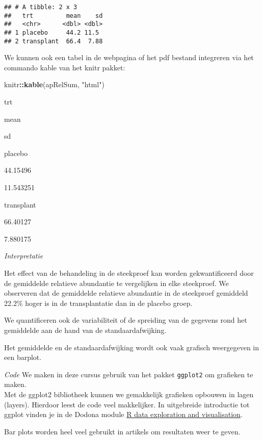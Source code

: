 \documentclass[
  12pt,dutch,coursenotes]{book}
\newenvironment{Shaded}{\begin{snugshade}}{\end{snugshade}}
\newcommand{\KeywordTok}[1]{\textcolor[rgb]{0.13,0.29,0.53}{\textbf{#1}}}
\newcommand{\NormalTok}[1]{#1}
\newcommand{\OperatorTok}[1]{\textcolor[rgb]{0.81,0.36,0.00}{\textbf{#1}}}
\newcommand{\StringTok}[1]{\textcolor[rgb]{0.31,0.60,0.02}{#1}}
\theoremstyle{definition}
\theoremstyle{definition}
\theoremstyle{definition}
\theoremstyle{remark}
\begin{document}
\begin{verbatim}
## # A tibble: 2 x 3
##   trt         mean    sd
##   <chr>      <dbl> <dbl>
## 1 placebo     44.2 11.5 
## 2 transplant  66.4  7.88
\end{verbatim}

We kunnen ook een tabel in de webpagina of het pdf bestand integreren via het commando kable van het knitr pakket:

\begin{Shaded}
\begin{Highlighting}[]
\NormalTok{knitr}\OperatorTok{::}\KeywordTok{kable}\NormalTok{(apRelSum, }\StringTok{"html"}\NormalTok{)}
\end{Highlighting}
\end{Shaded}

trt

mean

sd

placebo

44.15496

11.543251

transplant

66.40127

7.880175

\emph{Interpretatie}

Het effect van de behandeling in de steekproef kan worden gekwantificeerd door de gemiddelde relatieve abundantie te vergelijken in elke steekproef. We observeren dat de gemiddelde relatieve abundantie in de steekproef gemiddeld 22.2\% hoger is in de transplantatie dan in de placebo groep.

We quantificeren ook de variabiliteit of de spreiding van de gegevens rond het gemiddelde aan de hand van de standaardafwijking.

Het gemiddelde en de standaardafwijking wordt ook vaak grafisch weergegeven in een barplot.

\emph{Code}
We maken in deze cursus gebruik van het pakket \texttt{ggplot2} om grafieken te maken.\\
Met de ggplot2 bibliotheek kunnen we gemakkelijk grafieken opbouwen in lagen (layers).
Hierdoor leest de code veel makkelijker.
In uitgebreide introductie tot ggplot vinden je in de Dodona module \href{https://dodona.ugent.be/nl/courses/345/}{R data exploration and visualisation}.

Bar plots worden heel veel gebruikt in artikels om resultaten weer te geven.
\end{document}
